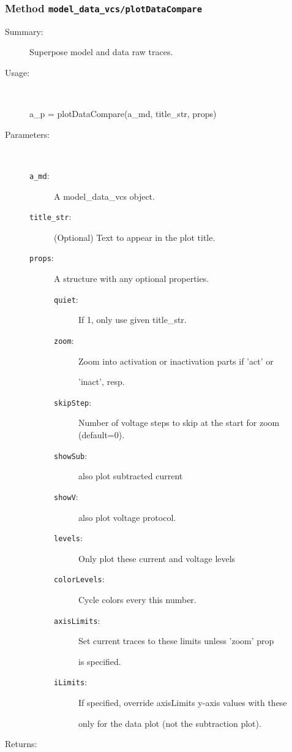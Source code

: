 \subsubsection[Method \texttt{plotDataCompare}]{Method \texttt{model\_data\_vcs/plotDataCompare}}%
%
\label{ref_model_data_vcs__plotDataCompare}%
\hypertarget{ref_model_data_vcs__plotDataCompare}{}%
\begin{description}
\item[Summary:]Superpose model and data raw traces.
%
\item[Usage:]~%
\begin{lyxcode}%
a\_p = plotDataCompare(a\_md, title\_str, props)
%
\end{lyxcode}%
%
%
\item[Parameters:]~
\begin{description}%
\item[\texttt{a\_md}:]
 A model\_data\_vcs object.
\item[\texttt{title\_str}:]
 (Optional) Text to appear in the plot title.
\item[\texttt{props}:]
 A structure with any optional properties.
\begin{description}%
\item[\texttt{quiet}:]
 If 1, only use given title\_str.
\item[\texttt{zoom}:]
 Zoom into activation or inactivation parts if 'act' or

'inact', resp.
\item[\texttt{skipStep}:]
 Number of voltage steps to skip at the start for zoom (default=0).
\item[\texttt{showSub}:]
 also plot subtracted current
\item[\texttt{showV}:]
 also plot voltage protocol.
\item[\texttt{levels}:]
 Only plot these current and voltage levels
\item[\texttt{colorLevels}:]
 Cycle colors every this number.
\item[\texttt{axisLimits}:]
 Set current traces to these limits unless 'zoom' prop

is specified.
\item[\texttt{iLimits}:]
 If specified, override axisLimits y-axis values with these

only for the data plot (not the subtraction plot).
\end{description}%
\end{description}%
%
\item[Returns:
]~


\end{description}
